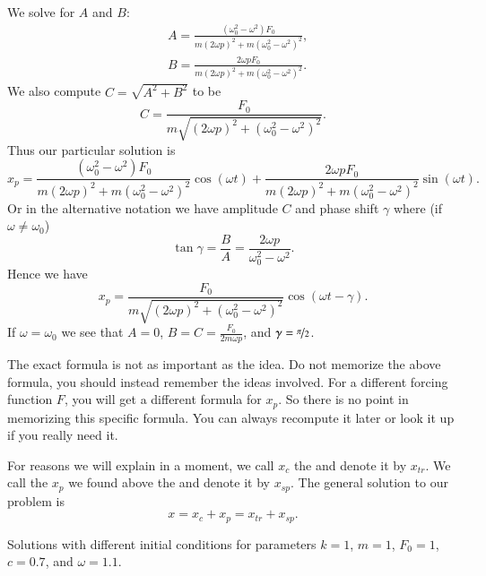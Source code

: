 We solve for $A$ and $B$:
\begin{align*}
& A=\frac{(\omega_0^2-\omega^2) F_0}
{m{(2\omega p)}^2+m{(\omega_0^2-\omega^2)}^2} , \\
& B=\frac{2 \omega p F_0}
{m{(2\omega p)}^2+m{(\omega_0^2-\omega^2)}^2} .
\end{align*}
We also compute $C = \sqrt{A^2+B^2}$
to be
\begin{equation*}
C = \frac{F_0}{m \sqrt{{(2\omega p)}^2+{(\omega_0^2-\omega^2)}^2}} .
\end{equation*}
Thus our particular solution is
\begin{equation*}
x_p = 
\frac{(\omega_0^2-\omega^2) F_0}
{m{(2\omega p)}^2+m{(\omega_0^2-\omega^2)}^2} \cos (\omega t) +
\frac{2 \omega p F_0}
{m{(2\omega p)}^2+m{(\omega_0^2-\omega^2)}^2} \sin (\omega t) .
\end{equation*}
Or in the alternative notation we have amplitude $C$ and phase shift $\gamma$
where (if $\omega \not= \omega_0$)
\begin{equation*}
\tan \gamma = \frac{B}{A} = \frac{2\omega p}{\omega_0^2-\omega^2} .
\end{equation*}
Hence we have
\begin{equation*}
\boxed{~~
x_p = 
\frac{F_0}{m \sqrt{{(2\omega p)}^2+{(\omega_0^2-\omega^2)}^2}} 
\cos ( \omega t - \gamma ) .
~~}
\end{equation*}
If $\omega = \omega_0$ we see that $A=0$, $B = C = \frac{F_0}{2m\omega p}$,
and $\gamma = \nicefrac{\pi}{2}$.

The exact formula is not as important as the idea.  Do not memorize
the above formula, you should instead remember the ideas involved.
For a different forcing function $F$, you will get a different formula
for $x_p$.
So there is no point in memorizing this specific
formula.  You can always recompute it later or look it up if you really need
it.

\medskip

For reasons we will explain in a moment, we call $x_c$ the
\emph{}
and denote it by $x_{tr}$.  We call the
$x_p$ we found above the \emph{} and denote it
by $x_{sp}$.
The general solution to our problem is
\begin{equation*}
x = x_c + x_p = x_{tr} + x_{sp} .
\end{equation*}

\begin{mywrapfig}{3.25in}
\capstart
{}
\caption{Solutions with different initial conditions for parameters
$k=1$, $m=1$, $F_0 = 1$, $c=0.7$, and $\omega=1.1$.\label{3.6:transbehfig}}
\end{mywrapfig}
%
%

